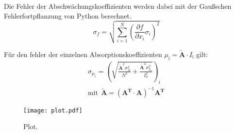 Die Fehler der Abschwächungskoeffizienten werden dabei mit der Gaußschen Fehlerfortpflanzung von Python berechnet.
\begin{equation}
  \sigma_f = \sqrt{
      \sum\limits_{i = 1}^N
       \left( \frac{\partial f}{\partial x_i} \sigma_i \right)^{\!\! 2}
     }
\end{equation}

Für den fehler der einzelnen Absorptionskoeffizienten $\mu_{\mathrm{i}}= \symbf{\tilde{A}} \cdot I_{\mathrm{i}}$ gilt:
\begin{align*}
  \sigma_{\mu_i} = \left(\sqrt{\frac{\symbf{\tilde{A}}^2 \sigma_{N}^2}{N^2} + \frac{\symbf{\tilde{A}}^{2} \sigma_{I_{0}}^2}{I_{0}^2}}\right)_i \\
  \text{mit}\:\: \symbf{\tilde{A}} = \left(\symbf{A^T} \cdot \symbf{A}\right)^{-1} \symbf{A^T}
\end{align*}

\begin{figure}
  \centering
  \texttt{[image: plot.pdf]}
  \caption{Plot.}
  \label{fig:plot}
\end{figure}
